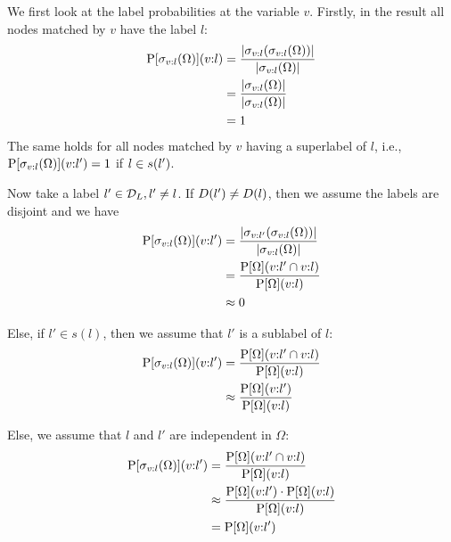 We first look at the label probabilities at the variable $v$.
Firstly, in the result all nodes matched by $v$ have the label $l$:
\begin{align}
\begin{split}
  \operatorname{P}[\sigma_{v:l}(\Omega)](v{:}l)
    &= \frac{{\left \vert \sigma_{v:l}(\sigma_{v:l}(\Omega)) \right \vert}}
            {{\left \vert \sigma_{v:l}(\Omega) \right \vert}} \\
    &= \frac{{\left \vert \sigma_{v:l}(\Omega) \right \vert}}
            {{\left \vert \sigma_{v:l}(\Omega) \right \vert}} \\
    &= 1
\end{split}
\end{align}
The same holds for all nodes matched by $v$ having a superlabel of $l$, i.e.,
$\operatorname{P}[\sigma_{v:l}(\Omega)](v{:}l') = 1$ if $l \in s(l')$.

Now take a label $l' \in \mathcal{D}_L, l' \not = l$. If
$D(l') \not = D(l)$, then we assume the labels are disjoint and we
have
\begin{align}
\begin{split}
  \operatorname{P}[\sigma_{v:l}(\Omega)](v{:}l')
    &= \frac{{\left \vert \sigma_{v:l'}(\sigma_{v:l}(\Omega)) \right \vert}}{{\left \vert \sigma_{v:l}(\Omega) \right \vert}} \\
    &= \frac{\operatorname{P}[\Omega](v{:}l' \cap v{:}l)}{\operatorname{P}[\Omega](v{:}l)} \\
    &\approx 0
\end{split}
\end{align}

Else, if $l' \in s(l)$, then we assume that $l'$ is a sublabel of $l$:
\begin{align}
\begin{split}
  \operatorname{P}[\sigma_{v:l}(\Omega)](v{:}l')
    &= \frac{\operatorname{P}[\Omega](v{:}l' \cap v{:}l)}{\operatorname{P}[\Omega](v{:}l)} \\
    &\approx \frac{\operatorname{P}[\Omega](v{:}l')}{\operatorname{P}[\Omega](v{:}l)}
\end{split}
\end{align}

Else, we assume that $l$ and $l'$ are independent in $\Omega$:
\begin{align}
\begin{split}
  \operatorname{P}[\sigma_{v:l}(\Omega)](v{:}l')
    &= \frac{\operatorname{P}[\Omega](v{:}l' \cap v{:}l)}{\operatorname{P}[\Omega](v{:}l)} \\
    &\approx \frac{\operatorname{P}[\Omega](v{:}l') \cdot \operatorname{P}[\Omega](v{:}l)}{\operatorname{P}[\Omega](v{:}l)} \\
    &= \operatorname{P}[\Omega](v{:}l')
\end{split}
\end{align}

